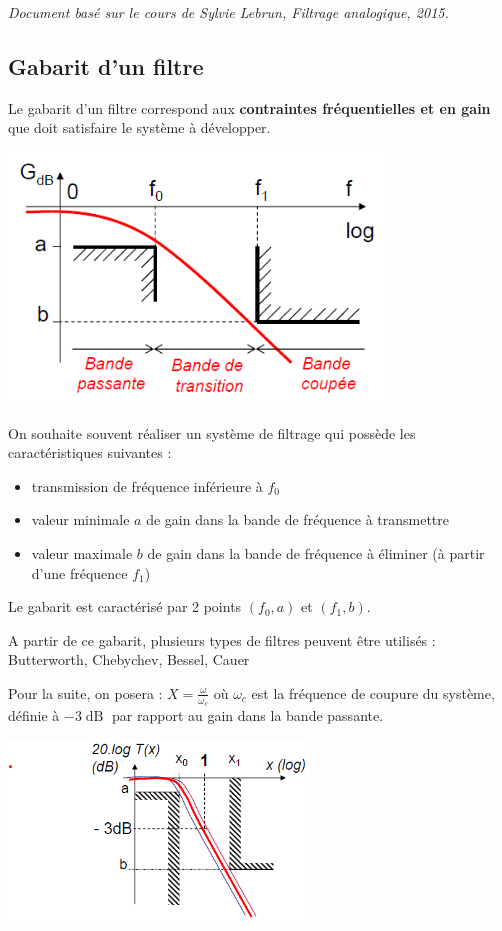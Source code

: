 \documentclass[a4paper,french]{paper}
\begin{document}
\textit{Document basé sur le cours de Sylvie Lebrun, Filtrage analogique, 2015.}

\subsection*{Gabarit d'un filtre}

Le gabarit d'un filtre correspond aux \textbf{contraintes fréquentielles et en gain} que doit satisfaire le système à développer.

\begin{center}
	\includegraphics[width=10cm]{images/gabarit_filtre.png}
\end{center}

On souhaite souvent réaliser un système de filtrage qui possède les caractéristiques suivantes :
\begin{itemize}
	\item transmission de fréquence inférieure à $f_0$
	\item valeur minimale $a$ de gain dans la bande de fréquence à transmettre
	\item valeur maximale $b$ de gain dans la bande de fréquence à éliminer (à partir d'une fréquence $f_1$)
\end{itemize}

Le gabarit est caractérisé par 2 points $(f_0, a)$ et $(f_1, b)$.

\medskip

A partir de ce gabarit, plusieurs types de filtres peuvent être utilisés : Butterworth, Chebychev, Bessel, Cauer

\bigskip

Pour la suite, on posera : $X = \frac{\omega}{\omega_c}$ où $\omega_c$ est la fréquence de coupure du système, définie à $-3\operatorname{dB}$ par rapport au gain dans la bande passante.


\begin{center}
	\includegraphics[width=8cm]{images/gabarit_butter.png}
\end{center}
\end{document}
